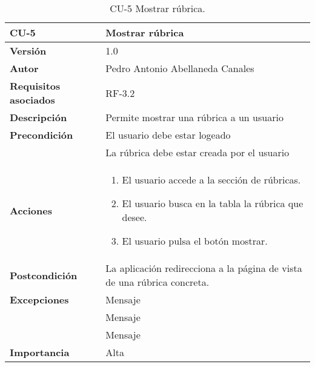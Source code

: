 \begin{table}[p]
	\centering
	\begin{tabularx}{\linewidth}{ p{} p{} }
		\toprule
		\textbf{CU-5}    & \textbf{Mostrar rúbrica} \\
		\midrule
		\textbf{Versión}              & 1.0    \\
		\textbf{Autor}                & Pedro Antonio Abellaneda Canales \\
		\textbf{Requisitos asociados} & RF-3.2 \\
		\textbf{Descripción}          & Permite mostrar una rúbrica a un usuario \\
		\textbf{Precondición}         & El usuario debe estar logeado \\& La rúbrica debe estar creada por el usuario \\
		\textbf{Acciones}             &
		\begin{enumerate}
			\def\labelenumi{\arabic{enumi}.}
			\tightlist
			\item El usuario accede a la sección de rúbricas.
            \item El usuario busca en la tabla la rúbrica que desee.
			\item El usuario pulsa el botón mostrar.
		\end{enumerate} \\
		\textbf{Postcondición}        & La aplicación redirecciona a la página de vista de una rúbrica concreta. \\ 
		\textbf{Excepciones}          & Mensaje \\ 
		                              & Mensaje \\ 
		                              & Mensaje \\
		\textbf{Importancia}          & Alta \\
		\bottomrule
	\end{tabularx}
	\caption{CU-5 Mostrar rúbrica.}
	\label{tab:CU-5}
\end{table}

